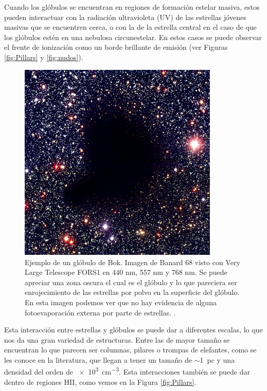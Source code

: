 \documentclass{book}
\begin{document}
Cuando los glóbulos se encuentran en regiones de formación estelar masiva, estos pueden interactuar con la radiación ultravioleta (UV) de las estrellas jóvenes masivas que se encuentren cerca, o con la de la estrella central en el caso de que los glóbulos estén en una nebulosa circunestelar. En estos casos se puede observar el frente de ionización como un borde brillante de emisión (ver Figuras \ref{fig:Pillars} y \ref{fig:nudos}).

\begin{figure}[htb]
    \centering
    \includegraphics[width=0.85\textwidth]{images Chapter 1/C1_Bok_globule.jpg}
    \caption{Ejemplo de un glóbulo de Bok. Imagen de Banard 68 visto con Very Large Telescope FORS1 en 440 nm, 557 nm y 768 nm. Se puede apreciar una zona oscura el cual es el glóbulo y lo que pareciera ser enrojecimiento de las estrellas por polvo en la superficie del glóbulo. En esta imagen podemos ver que no hay evidencia de alguna fotoevaporación externa por parte de estrellas. \citep{Alves:2001}.}
    \label{fig:Banard}
\end{figure}

Esta interacción entre estrellas y glóbulos se puede dar a diferentes escalas, lo que nos da una gran variedad de estructuras. Entre las de mayor tamaño se encuentran lo que parecen ser columnas, pilares o trompas de elefantes, como se les conoce en la literatura, que llegan a tener un tamaño de $\sim$\SI{1}{pc} y una densidad del orden de \SI{e3}{cm^{-3}}. Esta interacciones también se puede dar dentro de regiones HII, como vemos en la Figura \ref{fig:Pillars}.
\end{document}
